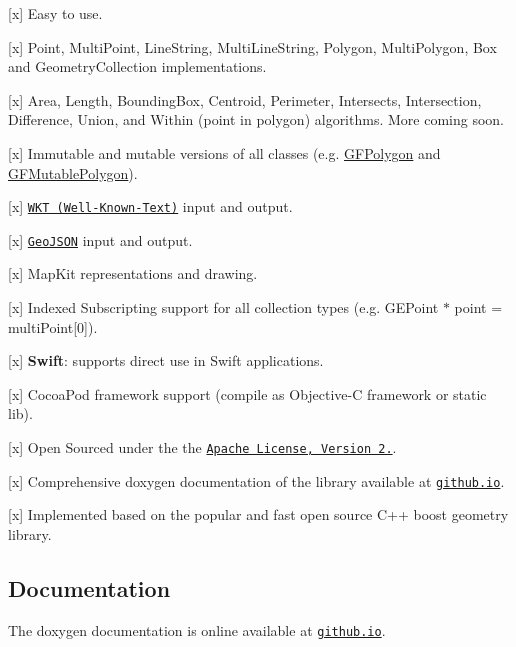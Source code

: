 \begin{DoxyItemize}
\item \mbox{[}x\mbox{]} Easy to use.
\item \mbox{[}x\mbox{]} Point, Multi\+Point, Line\+String, Multi\+Line\+String, Polygon, Multi\+Polygon, Box and Geometry\+Collection implementations.
\item \mbox{[}x\mbox{]} Area, Length, Bounding\+Box, Centroid, Perimeter, Intersects, Intersection, Difference, Union, and Within (point in polygon) algorithms. More coming soon.
\item \mbox{[}x\mbox{]} Immutable and mutable versions of all classes (e.\+g. {\ttfamily \hyperlink{interface_g_f_polygon}{G\+F\+Polygon}} and {\ttfamily \hyperlink{interface_g_f_mutable_polygon}{G\+F\+Mutable\+Polygon}}).
\item \mbox{[}x\mbox{]} \href{https://en.wikipedia.org/wiki/Well-known_text}{\tt W\+K\+T (Well-\/\+Known-\/\+Text)} input and output.
\item \mbox{[}x\mbox{]} \href{http://geojson.org/}{\tt Geo\+J\+S\+O\+N} input and output.
\item \mbox{[}x\mbox{]} Map\+Kit representations and drawing.
\item \mbox{[}x\mbox{]} Indexed Subscripting support for all collection types (e.\+g. {\ttfamily G\+E\+Point $\ast$ point = multi\+Point\mbox{[}0\mbox{]}}).
\item \mbox{[}x\mbox{]} {\bfseries Swift}\+: supports direct use in Swift applications.
\item \mbox{[}x\mbox{]} Cocoa\+Pod framework support (compile as Objective-\/\+C framework or static lib).
\item \mbox{[}x\mbox{]} Open Sourced under the the \href{http://www.apache.org/licenses/LICENSE-2.0.html}{\tt Apache License, Version 2.}.
\item \mbox{[}x\mbox{]} Comprehensive doxygen documentation of the library available at \href{http://tonystone.github.io/geofeatures}{\tt github.\+io}.
\item \mbox{[}x\mbox{]} Implemented based on the popular and fast open source C++ boost geometry library.
\end{DoxyItemize}

\subsection*{Documentation}

The doxygen documentation is online available at \href{http://tonystone.github.io/geofeatures}{\tt github.\+io}.

